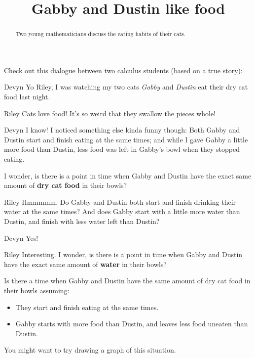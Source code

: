 \documentclass{ximera}
\title[Break-Ground:]{Gabby and Dustin like food}
\begin{document}
\begin{abstract}
Two young mathematicians discuss the eating habits of their cats.
\end{abstract}
\maketitle

Check out this dialogue between two calculus students (based on a true
story):

\begin{dialogue}
\item[Devyn] Yo Riley, I was watching my two cats
  \textit{Gabby} and \textit{Dustin} eat their dry cat food last night.
\item[Riley] Cats love food!  It's so weird that they swallow the pieces whole!
\item[Devyn] I know! I noticed something else kinda funny though:
  Both Gabby and Dustin start and finish eating at the same times; and
  while I gave Gabby a little more food than Dustin, less food was left
  in Gabby's bowl when they stopped eating.

  I wonder, is there is a point in time when Gabby and Dustin have the
  exact same amount of \textbf{dry cat food} in their bowls?
\item[Riley] Hmmmmm. Do Gabby and Dustin both start and finish
  drinking their water at the same times?  And does Gabby start with a
  little more water than Dustin, and finish with less water left than
  Dustin?
\item[Devyn] Yes!
\item[Riley] Interesting. I wonder, is there is a point in
  time when Gabby and Dustin have the exact same amount of \textbf{water}
  in their bowls?
\end{dialogue}

\begin{problem}
  Is there a time when Gabby and Dustin have the same amount of dry cat
  food in their bowls assuming:
  \begin{itemize}
  \item They start and finish eating at the same times.
  \item Gabby starts with more food than Dustin, and leaves less food uneaten than Dustin. 
  \end{itemize}
  \begin{hint}
  	You might want to try drawing a graph of this situation.
  \end{hint}
  \begin{multipleChoice}
  \end{multipleChoice}
\end{problem}
\end{document}
